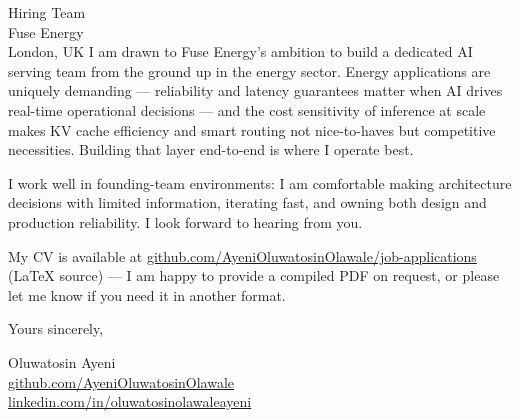 \documentclass[12pt,a4paper]{letter}
\begin{document}
\begin{letter}{Hiring Team \\ Fuse Energy \\ London, UK}
I am drawn to Fuse Energy's ambition to build a dedicated AI serving team from the ground up in the energy sector. Energy applications are uniquely demanding — reliability and latency guarantees matter when AI drives real-time operational decisions — and the cost sensitivity of inference at scale makes KV cache efficiency and smart routing not nice-to-haves but competitive necessities. Building that layer end-to-end is where I operate best.

I work well in founding-team environments: I am comfortable making architecture decisions with limited information, iterating fast, and owning both design and production reliability. I look forward to hearing from you.

My CV is available at \href{https://github.com/AyeniOluwatosinOlawale/job-applications/blob/master/cv/main_fuseenergy_ai-inference-engineer.tex}{github.com/AyeniOluwatosinOlawale/job-applications} (LaTeX source) — I am happy to provide a compiled PDF on request, or please let me know if you need it in another format.

\closing{Yours sincerely,}

Oluwatosin Ayeni \\
\href{https://github.com/AyeniOluwatosinOlawale}{github.com/AyeniOluwatosinOlawale} \\
\href{https://www.linkedin.com/in/oluwatosinolawaleayeni/}{linkedin.com/in/oluwatosinolawaleayeni}

\end{letter}
\end{document}
